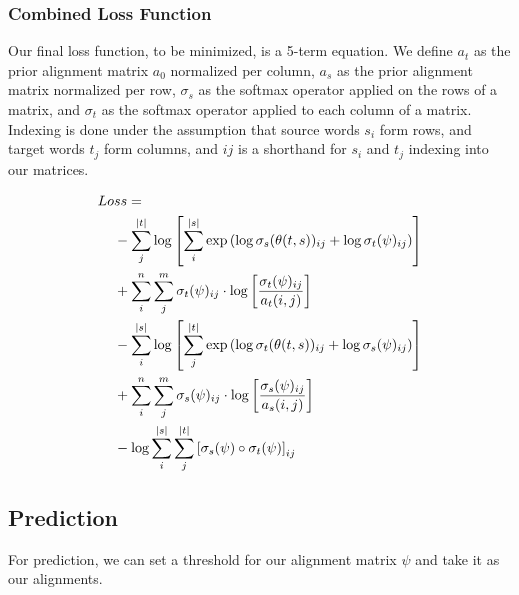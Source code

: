 \documentclass[twoside,twocolumn]{article}
\begin{document}
\subsubsection{Combined Loss Function}

Our final loss function, to be minimized, is a 5-term equation. We define $a_t$
as the prior alignment matrix $a_0$ normalized per column, $a_s$ as the prior
alignment matrix normalized per row, $\sigma_s$ as the softmax operator applied
on the rows of a matrix, and $\sigma_t$ as the softmax operator applied to each
column of a matrix. Indexing is done under the assumption that source words
$s_i$ form rows, and target words $t_j$ form columns, and $ij$ is a shorthand
for $s_i$ and $t_j$ indexing into our matrices.

\begin{equation}
  \centering
\begin{split}
  Lo&ss = \\
  &- \sum_j^{|t|} \log \left[
      \sum_i^{|s|} \exp \left(
        \log \sigma_s(\theta(t, s))_{ij} + \log \sigma_t(\psi)_{ij} \right)
    \right] \\
  &+ \sum_i^n \sum_j^m \sigma_t(\psi)_{ij} \cdot \log \left[
    \frac{\sigma_t(\psi)_{ij}}{a_t(i, j)} \right] \\
  &- \sum_i^{|s|} \log \left[ \sum_j^{|t|}
      \exp \left(
        \log \sigma_t(\theta(t, s))_{ij} + \log \sigma_s(\psi)_{ij}
      \right)
    \right] \\
  &+ \sum_i^n \sum_j^m \sigma_s(\psi)_{ij} \cdot \log \left[
    \frac{\sigma_s(\psi)_{ij}}{a_s(i, j)} \right] \\
  &- \log \sum_i^{|s|} \sum_j^{|t|} \left[
    \sigma_s(\psi) \circ \sigma_t(\psi) \right]_{ij} \\
\end{split}
\end{equation}



\subsection{Prediction}

For prediction, we can set a threshold for our alignment matrix $\psi$ and take
it as our alignments.
\end{document}
